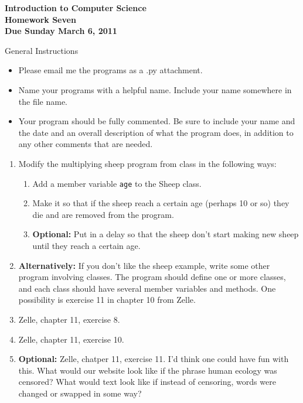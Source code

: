 \documentclass[12pt]{article}
\begin{document}
\pagestyle{empty}
 
\begin{center}
{\large {\bf Introduction to Computer Science}}\\
\medskip
{\large {\bf Homework Seven}}\\
\medskip
{ {\bf Due Sunday March 6, 2011}}\\ 
\end{center}


\noindent General Instructions

\begin{itemize}
\setlength{\itemsep}{-1mm}
  \item Please email me the programs as a .py attachment.
  \item Name your programs with a helpful name.  Include your name
    somewhere in the file name.
  \item Your program should be fully commented.  Be sure to include
    your name and the date and an overall description of what the
    program does, in addition to any other comments that are needed. \\
\end{itemize}






\begin{enumerate}

  \item Modify the multiplying sheep program from class in the
    following ways: 
\begin{enumerate}
    \item Add a member variable {\tt age} to the Sheep class.
    \item Make it so that if the sheep reach a certain age (perhaps 10
      or so) they die
      and are removed from the program.
    \item {\bf Optional:}  Put in a delay so that the sheep don't
      start making new sheep until they reach a certain age. 
\end{enumerate}  

  \item {\bf Alternatively:} If you don't like the sheep example,
    write some other program involving classes.  The program should
    define one or more classes, and each class should have several
    member variables and methods.  One possibility is exercise 11 in
    chapter 10 from Zelle.

  \item Zelle, chapter 11, exercise 8. 

  \item  Zelle, chapter 11, exercise 10.

  \item {\bf Optional:}  Zelle, chatper 11, exercise 11.  I'd think
    one could have fun with this.  What would our website look like if
    the phrase human ecology was censored?  What would text look like
    if instead of censoring, words were changed or swapped in some
    way?  

\end{enumerate}
\end{document}
